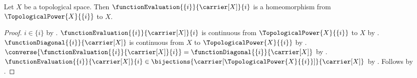 \begin{theorem}\label{singleton_power_evaluation_homeomorphism}
    Let $X$ be a topological space.
    Then $\functionEvaluation{\{i\}}{\carrier[X]}{i}$ is a homeomorphism from
        $\TopologicalPower{X}{\{i\}}$ to $X$.
\end{theorem}
\begin{proof}
    $i\in\{i\}$ by .
    $\functionEvaluation{\{i\}}{\carrier[X]}{i}$ is continuous from
        $\TopologicalPower{X}{\{i\}}$ to $X$ by .
    $\functionDiagonal{\{i\}}{\carrier[X]}$ is continuous from $X$ to
        $\TopologicalPower{X}{\{i\}}$ by .
    $\converse{\functionEvaluation{\{i\}}{\carrier[X]}{i}}
        =\functionDiagonal{\{i\}}{\carrier[X]}$ by .
    $\functionEvaluation{\{i\}}{\carrier[X]}{i}\in
        \bijections{\carrier[\TopologicalPower{X}{\{i\}}]}{\carrier[X]}$ by
        .
    Follows by .
\end{proof}
